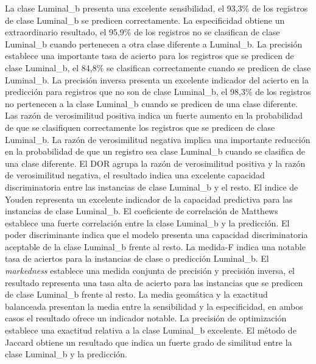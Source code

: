 La clase Luminal\_b presenta una excelente sensibilidad, el 93,3\% de los registros de clase Luminal\_b se predicen correctamente. La especificidad obtiene un extraordinario resultado, el 95,9\% de los registros no se clasifican de clase Luminal\_b cuando pertenecen a otra clase diferente a Luminal\_b. La precisión establece una importante tasa de acierto para los registros que se predicen de clase Luminal\_b, el 84,8\% se clasifican correctamente cuando se predicen de clase Luminal\_b. La precisión inversa presenta un excelente indicador del acierto en la predicción para registros que no son de clase Luminal\_b, el 98,3\% de los registros no pertenecen a la clase Luminal\_b cuando se predicen de una clase diferente. Las razón de verosimilitud positiva indica un fuerte aumento en la probabilidad de que se clasifiquen correctamente los registros que se predicen de clase Luminal\_b. La razón de verosimilitud negativa implica una importante reducción en la probabilidad de que un registro sea clase Luminal\_b cuando se clasifica de una clase diferente. El DOR agrupa la razón de verosimilitud positiva y la razón de verosimilitud negativa, el resultado indica una excelente capacidad discriminatoria entre las instancias de clase Luminal\_b y el resto. El indice de Youden representa un excelente indicador de la capacidad predictiva para las instancias de clase Luminal\_b. El coeficiente de correlación de Matthews establece una fuerte correlación entre la clase Luminal\_b y la predicción. El poder discriminante indica que el modelo presenta una capacidad discriminatoria aceptable de la clase Luminal\_b frente al resto. La medida-F indica una notable tasa de aciertos para la instancias de clase o predicción Luminal\_b. El \textit{markedness} establece una medida conjunta de precisión y precisión inversa, el resultado representa una tasa alta de acierto para las instancias que se predicen de clase Luminal\_b frente al resto. La media geomática y la exactitud balanceada presentan la media entre la sensibilidad y la especificidad, en ambos casos el resultado ofrece un indicador notable. La precisión de optimización establece una exactitud relativa a la clase Luminal\_b excelente. El método de Jaccard obtiene un resultado que indica un fuerte grado de similitud entre la clase Luminal\_b y la predicción.

\bigbreak

